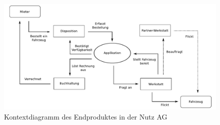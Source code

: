  \begin{figure}
    \centering
    \includegraphics[width=20.5cm,angle=-90]{graphics/kontextdiagramm.pdf}
    \caption{Kontextdiagramm des Endproduktes in der Nutz AG}
    \label{fig:awesome_image}
  \end{figure}
